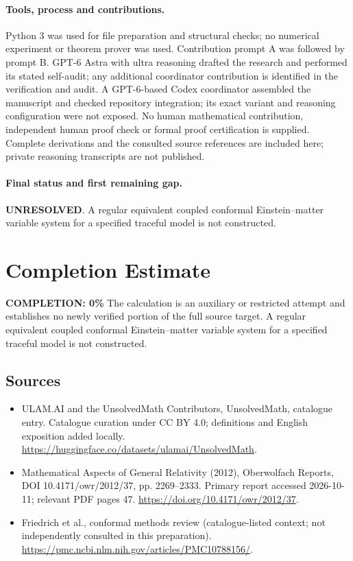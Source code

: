 \documentclass[11pt]{article}
\begin{document}
\paragraph{Tools, process and contributions.}
Python 3 was used for file preparation and structural checks; no numerical experiment or theorem prover was used. Contribution prompt A was followed by prompt B. GPT-6 Astra with ultra reasoning drafted the research and performed its stated self-audit; any additional coordinator contribution is identified in the verification and audit. A GPT-6-based Codex coordinator assembled the manuscript and checked repository integration; its exact variant and reasoning configuration were not exposed. No human mathematical contribution, independent human proof check or formal proof certification is supplied. Complete derivations and the consulted source references are included here; private reasoning transcripts are not published.

\paragraph{Final status and first remaining gap.}
\textbf{UNRESOLVED}. A regular equivalent coupled conformal Einstein–matter variable system for a specified traceful model is not constructed.

\section{Completion Estimate}
\noindent\textbf{COMPLETION: 0\%}
The calculation is an auxiliary or restricted attempt and establishes no newly verified portion of the full source target. A regular equivalent coupled conformal Einstein–matter variable system for a specified traceful model is not constructed.

\subsection{Sources}
\begin{itemize}
\item[\hypertarget{source:statement:1}{S1}] ULAM.AI and the UnsolvedMath Contributors, UnsolvedMath, catalogue entry. Catalogue curation under CC BY 4.0; definitions and English exposition added locally.
\url{https://huggingface.co/datasets/ulamai/UnsolvedMath}.
\item[\hypertarget{source:statement:2}{S2}] Mathematical Aspects of General Relativity (2012), Oberwolfach Reports, DOI 10.4171/owr/2012/37, pp. 2269--2333. Primary report accessed 2026-10-11; relevant PDF pages 47.
\url{https://doi.org/10.4171/owr/2012/37}.
\item[\hypertarget{source:statement:3}{S3}] Friedrich et al., conformal methods review (catalogue-listed context; not independently consulted in this preparation).
\url{https://pmc.ncbi.nlm.nih.gov/articles/PMC10788156/}.
\end{itemize}
\label{end:statement}
\end{document}

